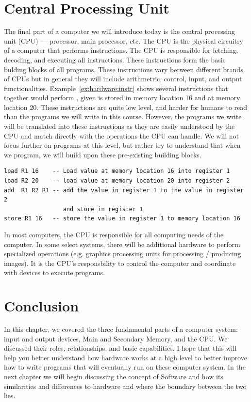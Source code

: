 \section {Central Processing Unit}

The final part of a computer we will introduce today is the central processing
unit (CPU) --- processor, main processor, etc. The CPU is the physical
circuitry of a computer that performs instructions. The CPU is responsible for
fetching, decoding, and executing all instructions. These instructions form the
basic bulding blocks of all programs. These instructions vary between different
brands of CPUs but in general they will include arithmetric, control, input, and
output functionalities. Example~\ref{ex:hardware:instr} shows several instructions
that together would perform , given  is stored in memory
location 16 and  at memory location 20. These instructions are quite low
level, and harder for humans to read than the programs we will write in this course.
However, the programs we write will be translated into these instructions as they
are easily understood by the CPU and match directly with the operations the CPU
can handle. We will not focus further on programs at this level, but rather try
to understand that when we program, we will build upon these pre-existing
building blocks.

\begin{example}
\label{ex:hardware:instr}
\begin{verbatim}
load R1 16    -- Load value at memory location 16 into register 1
load R2 20    -- load value at memory location 20 into register 2
add  R1 R2 R1 -- add the value in register 1 to the value in register 2
                 and store in register 1
store R1 16   -- store the value in register 1 to memory location 16
\end{verbatim}
\end{example}

In most computers, the CPU is responsible for all computing needs of the computer.
In some select systems, there will be additional hardware to perform specialized
operations (e.g. graphics processing units for processing / producing images). It
is the CPU's responsbility to control the computer and coordinate with devices
to execute programs.

\section {Conclusion}
In this chapter, we covered the three fundamental parts of a computer system:
input and output devices, Main and Secondary Memory, and the CPU. We discussed
their roles, relationships, and basic capabilities. I hope that this will help
you better understand how hardware works at a high level to better improve how
to write programs that will eventually run on these computer system. In the
next chapter we will begin discussing the concept of Software and how its
similarities and differences to hardware and where the boundary between the two
lies.
